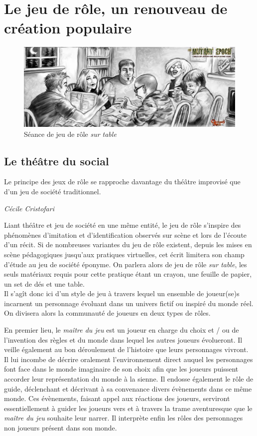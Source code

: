 \section{Le jeu de rôle, un renouveau de création populaire}

\begin{figure}[h!]
    \centering
    \includegraphics[width=0.80\linewidth]{img/rpg_tabletop1.jpg}
    \caption{Séance de jeu de rôle \textit{sur table}}
\end{figure}

\subsection{Le théâtre du social}

\begin{shadequote}
Le principe des jeux de rôle se rapproche davantage du théâtre improvisé que d'un jeu de société traditionnel. \par\emph{C{\'e}cile Cristofari \cite{cristofari2010lecteur}}
\end{shadequote}

Liant théâtre et jeu de société en une même entité, le jeu de rôle s'inspire des phénomènes d'imitation et d'identification observés sur scène et lors de l'écoute d'un récit. Si de nombreuses variantes du jeu de rôle existent, depuis les mises en scène pédagogiques jusqu'aux pratiques virtuelles, cet écrit limitera son champ d'étude au jeu de société éponyme. On parlera alors de jeu de rôle \textit{sur table}, les seuls matériaux requis pour cette pratique étant un crayon, une feuille de papier, un set de dés et une table.\\

Il s'agît donc ici d'un style de jeu à travers lequel un ensemble de joueur(se)s incarnent un personnage évoluant dans un univers fictif ou inspiré du monde réel. On divisera alors la communauté de joueurs en deux types de rôles.

En premier lieu, le \textit{maître du jeu} est un joueur en charge du choix et  / ou de l'invention des règles et du monde dans lequel les autres joueurs évolueront. Il veille également au bon déroulement de l'histoire que leurs personnages vivront. Il lui incombe de décrire oralement l'environnement direct auquel les personnages font face dans le monde imaginaire de son choix afin que les joueurs puissent accorder leur représentation du monde à la sienne. Il endosse également le rôle de guide, déclenchant et décrivant à sa convenance divers évènements dans ce même monde. Ces évènements, faisant appel aux réactions des joueurs, serviront essentiellement à guider les joueurs vers et à travers la trame aventuresque que le \textit{maître du jeu} souhaite leur narrer. Il interprète enfin les rôles des personnages non joueurs présent dans son monde.

